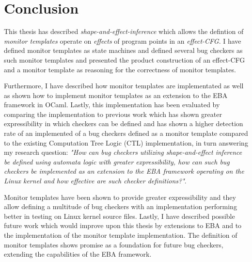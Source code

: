 \section{Conclusion}

This thesis has described \textit{shape-and-effect-inference} which allows the defintion of \textit{monitor templates} operate on \textit{effects} of program points in an \textit{effect-CFG}. I have defined monitor templates as state machines and defined several bug checkers as such monitor templates and presented the product construction of an effect-CFG and a monitor template as reasoning for the correctness of monitor templates. 

\newpar Furthermore, I have described how monitor templates are implementated as well as shown how to implement monitor templates as an extension to the EBA framework in OCaml. Lastly, this implementation has been evaluated by comparing the implementation to previous work which has shown greater expressibility in which checkers can be defined and has shown a higher detection rate of an implemented of a bug checkers defined as a monitor template compared to the existing Computation Tree Logic (CTL) implementation, in turn answering my research question: \textit{"How can bug checkers utilizing shape-and-effect inference be defined using automata logic with greater expressibility, how can such bug checkers be implemented as an extension to the EBA framework operating on the Linux kernel and how effective are such checker definitions?"}.

\newpar Monitor templates have been shown to provide greater expressibility and they allow defining a multitude of bug checkers with an implementation performing better in testing on Linux kernel source files. Lastly, I have described possible future work which would improve upon this thesis by extensions to EBA and to the implementation of the monitor template implementation. The definition of monitor templates shows promise as a foundation for future bug checkers, extending the capabilities of the EBA framework. 